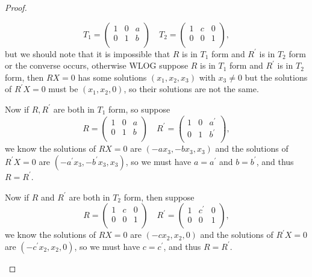 \begin{proof}
\begin{itemize}
        \[
            T_1 = \begin{pmatrix}
                1 & 0 & a  \\
                0 & 1 & b  \\
            \end{pmatrix} \quad 
            T_2 = \begin{pmatrix}
                1 & c & 0   \\
                0 & 0 & 1   \\
            \end{pmatrix},
        \] but we should note that it is impossible that \(R\) is in \(T_1\) form and \(R^{\prime} \) is in \(T_2\) form or the converse occurs, otherwise WLOG suppose \(R\) is in \(T_1\) form and \(R^{\prime} \) is in \(T_2\) form, then \(RX=0\) has some solutions \((x_1, x_2, x_3)\) with \(x_3 \neq 0\) but the solutions of \(R^{\prime} X = 0\) must be \((x_1, x_2, 0)\), so their solutions are not the same.
        
        Now if \(R, R^{\prime} \) are both in \(T_1\) form, so suppose 
        \[
            R = \begin{pmatrix}
                1 & 0 & a  \\
                0 & 1 & b  \\
            \end{pmatrix} \quad R^{\prime} = \begin{pmatrix}
                1 & 0 & a^{\prime}   \\
                0 & 1 & b^{\prime}   \\
            \end{pmatrix},
        \]  we know the solutions of \(RX=0\) are \(\left( -a x_3, -b x_3, x_3 \right) \) and the solutions of \(R^{\prime} X = 0\) are \(\left( -a^{\prime} x_3, -b^{\prime} x_3, x_3 \right) \), so we must have \(a = a^{\prime} \) and \(b = b^{\prime} \), and thus \(R = R^{\prime} \). 
        
        Now if \(R\) and \(R^{\prime} \) are both in \(T_2\) form, then suppose 
        \[
            R = \begin{pmatrix}
                1 & c & 0  \\
                0 & 0 & 1  \\
            \end{pmatrix} \quad 
            R^{\prime} = \begin{pmatrix}
                1 & c^{\prime}  & 0  \\
                0 & 0 & 1  \\
            \end{pmatrix},
        \] we know the solutions of \(RX = 0\) are \(\left( -c x_2, x_2, 0 \right) \) and the solutions of \(R^{\prime} X = 0\) are \(\left( -c^{\prime} x_2, x_2 , 0 \right) \), so we must have \(c = c^{\prime} \), and thus \(R = R^{\prime} \).         
    \end{itemize}    
\end{proof}
